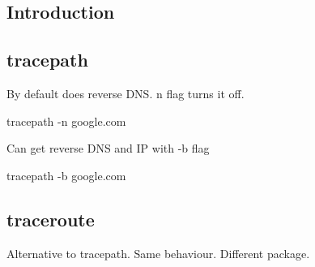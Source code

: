 
\subsection{Introduction}

\subsection{tracepath}

By default does reverse DNS. n flag turns it off.

tracepath -n google.com

Can get reverse DNS and IP with -b flag

tracepath -b google.com

\subsection{traceroute}

Alternative to tracepath. Same behaviour. Different package.
